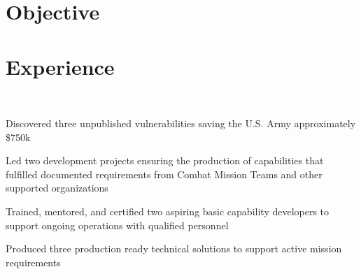 \documentclass[]{resume}
\begin{document}
\hfill
\begin{minipage}[t]{0.69\textwidth}

\section{Objective}

\sectionsep

\section{Experience}

 \\
\vspace{\topsep} %
\begin{tightemize}
\item Discovered three unpublished vulnerabilities saving the U.S. Army approximately \$750k
\item Led two development projects ensuring the production of capabilities that fulfilled documented requirements from Combat Mission Teams and other supported organizations 
\item Trained, mentored, and certified two aspiring basic capability developers to support ongoing operations with qualified personnel
\item Produced three production ready technical solutions to support active mission requirements
\end{tightemize}

\sectionsep


\end{minipage}
\end{document}
